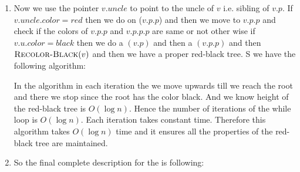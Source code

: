 \documentclass[a4paper, 11pt]{article}
\begin{document}
{\begin{enumerate}[label=(\roman*),resume]
\item[] Now we use the pointer $v.\textit{uncle}$ to point to the uncle of $v$ i.e. sibling of $v.p$. If $v.\textit{uncle}.\textit{color}=red$ then we do  on ($v.p.p$) and then we move to $v.p.p$ and check if the colors of $v.p.p$ and $v.p.p.p$ are same or not other wise if $v.u.\textit{color}=black$ then we do a $(v.p)$ and then a $(v.p.p)$ and then  $\textsc{Recolor-Black}(v)$ and then we have a proper red-black tree. S we have the following algorithm:
\begin{algorithm}
	\DontPrintSemicolon
{}
\caption{($x$)}
\end{algorithm}
In the algorithm in each iteration the we move upwards till we reach the root and there we stop since the root has the color black. And we know height of the red-black tree is $O(\log n)$. Hence the number of iterations of the while loop is $O(\log n)$. Each iteration takes constant time. Therefore this algorithm takes $O(\log n)$ time and it ensures all the properties of the red-black tree are maintained.
\item So the final complete description for the   is following:
\begin{algorithm}
\caption{($T_1,x,T_2$)}
\end{algorithm}
\end{enumerate}
}
%
\end{document}

